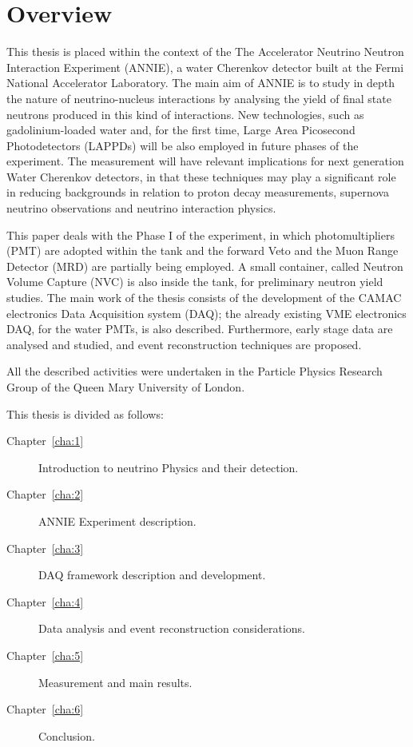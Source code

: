 \clearpage
\pagestyle{plain}
\chapter{Overview}
This thesis is placed within the context of the %
The Accelerator Neutrino Neutron Interaction Experiment (ANNIE), a water Cherenkov %
detector built at the Fermi National Accelerator Laboratory.
The main aim of ANNIE is to study in depth the nature of neutrino-nucleus interactions %
by analysing the yield of final state neutrons produced in this kind of interactions.
New technologies, such as gadolinium-loaded water and, for the first time, %
Large Area Picosecond Photodetectors (LAPPDs) will be also employed in future phases of %
the experiment.
The measurement will have relevant implications for next generation Water Cherenkov detectors, %
in that these techniques may play a significant role %
in reducing backgrounds in relation to proton decay measurements, %
supernova neutrino observations and neutrino interaction physics.

This paper deals with the Phase I of the experiment, in which photomultipliers (PMT) are adopted %
within the tank and the forward Veto and the Muon Range Detector (MRD) are %
partially being employed.
A small container, called Neutron Volume Capture (NVC) %
is also inside the tank, for preliminary neutron yield studies.
The main work of the thesis consists of the development of the CAMAC electronics %
Data Acquisition system (DAQ); the already existing VME electronics DAQ, %
for the water PMTs, is also described.
Furthermore, early stage data are analysed and studied, and event reconstruction %
techniques are proposed.

All the described activities were undertaken in the Particle Physics Research Group of the %
Queen Mary University of London.

\vspace{25mm}
This thesis is divided as follows:
\begin{description}
  \item[Chapter~\ref{cha:1}] Introduction to neutrino Physics and their detection.
  \item[Chapter~\ref{cha:2}] ANNIE Experiment description.
  \item[Chapter~\ref{cha:3}] DAQ framework description and development.
  \item[Chapter~\ref{cha:4}] Data analysis and event reconstruction considerations.
  \item[Chapter~\ref{cha:5}] Measurement and main results.
  \item[Chapter~\ref{cha:6}] Conclusion.
\end{description}
